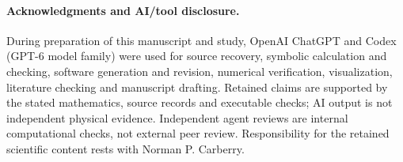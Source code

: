 \documentclass[11pt,a4paper]{article}
\begin{document}
\paragraph{Acknowledgments and AI/tool disclosure.}
During preparation of this manuscript and study, OpenAI ChatGPT and
Codex (GPT-6 model family) were used for source recovery, symbolic
calculation and checking, software generation and revision, numerical
verification, visualization, literature checking and manuscript drafting.
Retained claims are supported by the stated mathematics, source records
and executable checks; AI output is not independent physical evidence.
Independent agent reviews are internal computational checks, not external
peer review. Responsibility for the retained scientific content rests
with Norman P. Carberry.

\appendix


\setlength{\bibsep}{2pt}

\end{document}

